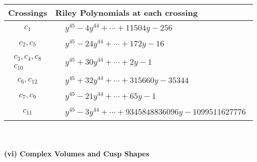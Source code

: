 \documentclass[1p]{elsarticle_modified}
\theoremstyle{definition}
\begin{document}
\begin{tabular}{m{50pt}|m{274pt}}
Crossings & \hspace{64pt}Riley Polynomials at each crossing \\
\hline $$\begin{aligned}c_{1}\end{aligned}$$&$\begin{aligned}
&y^{45}-4 y^{44}+\cdots+11504 y-256
\end{aligned}$\\
\hline $$\begin{aligned}c_{2},c_{5}\end{aligned}$$&$\begin{aligned}
&y^{45}-24 y^{44}+\cdots+172 y-16
\end{aligned}$\\
\hline $$\begin{aligned}c_{3},c_{4},c_{8}\\c_{10}\end{aligned}$$&$\begin{aligned}
&y^{45}+30 y^{44}+\cdots+2 y-1
\end{aligned}$\\
\hline $$\begin{aligned}c_{6},c_{12}\end{aligned}$$&$\begin{aligned}
&y^{45}+32 y^{44}+\cdots+315660 y-35344
\end{aligned}$\\
\hline $$\begin{aligned}c_{7},c_{9}\end{aligned}$$&$\begin{aligned}
&y^{45}-21 y^{44}+\cdots+65 y-1
\end{aligned}$\\
\hline $$\begin{aligned}c_{11}\end{aligned}$$&$\begin{aligned}
&y^{45}-3 y^{44}+\cdots+9345848836096 y-1099511627776
\end{aligned}$\\
\hline
\end{tabular}\\~\\
\newpage\flushleft \textbf{(vi) Complex Volumes and Cusp Shapes}
\end{document}
